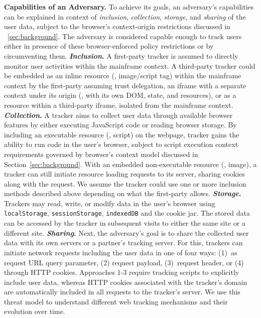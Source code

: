 \noindent \textbf{Capabilities of an Adversary.} 
%
%
To achieve its goals, an adversary's capabilities can be explained in context of \textit{inclusion}, \textit{collection}, \textit{storage}, and \textit{sharing} of the user data, subject to the browser's context-origin restrictions discussed in ~\autoref{sec:background}.
%
The adversary is considered capable enough to track users either in presence of these browser-enforced policy restrictions or by circumventing them.
%
\textbf{\textit{Inclusion}.} 
%
A first-party tracker is assumed to directly monitor user activities within the mainframe context.
%
A third-party tracker could be embedded as an inline resource (\eg{}, image/script tag) within the mainframe context by the first-party assuming trust delegation, an iframe with a separate context under its origin (\ie{}, with its own DOM, state, and resources), or as a resource within a third-party iframe, isolated from the mainframe context. 
%
\textbf{\textit{Collection}.}
%
A tracker aims to collect user data through available browser features by either executing JavaScript code or reading browser storage.
%
By including an executable resource (\eg{}, script) on the webpage, tracker gains the ability to run code in the user’s browser, subject to script execution context requirements governed by browser's context model discussed in Section~\ref{sec:background}.
%
With an embedded non-executable resource (\eg{}, image), a tracker can still initiate resource loading requests to its server, sharing cookies along with the request.
%
We assume the tracker could use one or more inclusion methods described above depending on what the first-party allows.
%
\textbf{\textit{Storage}.}
%
Trackers may read, write, or modify data in the user's browser using \texttt{localStorage}, \texttt{sessionStorage}, \texttt{indexedDB} and the cookie jar.
%
The stored data can be accessed by the tracker in subsequent visits to either the same site or a different site.
%
\textbf{\textit{Sharing}.}
%
Next, the adversary's goal is to share the collected user data with its own servers or a partner's tracking server.
%
For this, trackers can initiate network requests including the user data in one of four ways: (1)~as request URL query parameter, (2) request payload, (3)~request header, or (4) through HTTP cookies.
%
Approaches 1-3 require tracking scripts to explicitly include user data, whereas HTTP cookies associated with the tracker's domain are automatically included in all requests to the tracker's server. %
%
We use this threat model to understand different web tracking mechanisms and their evolution over time.